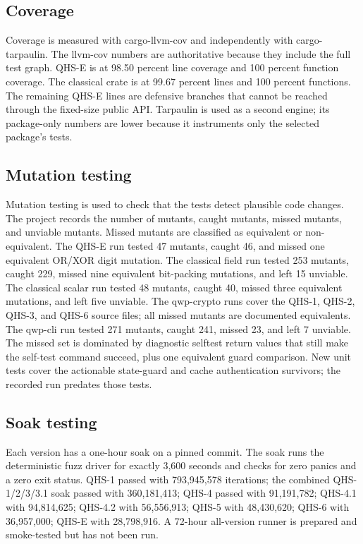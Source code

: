 \documentclass[11pt,a4paper]{article}
\begin{document}
\clearpage
\subsection{Coverage}

Coverage is measured with cargo-llvm-cov and independently with
cargo-tarpaulin. The llvm-cov numbers are authoritative because they include
the full test graph. QHS-E is at 98.50 percent line coverage and 100 percent
function coverage. The classical crate is at 99.67 percent lines and 100
percent functions. The remaining QHS-E lines are defensive branches that
cannot be reached through the fixed-size public API. Tarpaulin is used as a
second engine; its package-only numbers are lower because it instruments only
the selected package's tests.

\subsection{Mutation testing}

Mutation testing is used to check that the tests detect plausible code
changes. The project records the number of mutants, caught mutants, missed
mutants, and unviable mutants. Missed mutants are classified as equivalent or
non-equivalent. The QHS-E run tested 47 mutants, caught 46, and missed one
equivalent OR/XOR digit mutation. The classical field run tested 253 mutants,
caught 229, missed nine equivalent bit-packing mutations, and left 15
unviable. The classical scalar run tested 48 mutants, caught 40, missed three
equivalent mutations, and left five unviable. The qwp-crypto runs cover the
QHS-1, QHS-2, QHS-3, and QHS-6 source files; all missed mutants are documented
equivalents. The qwp-cli run tested 271 mutants, caught 241, missed 23, and
left 7 unviable. The missed set is dominated by diagnostic selftest return
values that still make the self-test command succeed, plus one equivalent
guard comparison. New unit tests cover the actionable state-guard and cache
authentication survivors; the recorded run predates those tests.

\subsection{Soak testing}

Each version has a one-hour soak on a pinned commit. The soak runs the
deterministic fuzz driver for exactly 3,600 seconds and checks for zero panics
and a zero exit status. QHS-1 passed with 793,945,578 iterations; the combined
QHS-1/2/3/3.1 soak passed with 360,181,413; QHS-4 passed with 91,191,782;
QHS-4.1 with 94,814,625; QHS-4.2 with 56,556,913; QHS-5 with 48,430,620;
QHS-6 with 36,957,000; QHS-E with 28,798,916. A 72-hour all-version runner is
prepared and smoke-tested but has not been run.
\end{document}

